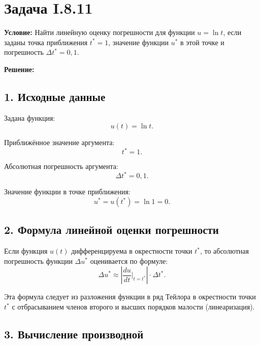 \documentclass{article}
\begin{document}
\section*{Задача I.8.11}

\textbf{Условие:} Найти линейную оценку погрешности для функции $u = \ln t$, если заданы точка приближения $t^* = 1$, значение функции $u^*$ в этой точке и погрешность $\Delta t^* = 0{,}1$.

\vspace{0.5cm}
\textbf{Решение:}

\subsection*{1. Исходные данные}

Задана функция:
\begin{equation}
u(t) = \ln t.
\end{equation}

Приближённое значение аргумента:
\begin{equation}
t^* = 1.
\end{equation}

Абсолютная погрешность аргумента:
\begin{equation}
\Delta t^* = 0{,}1.
\end{equation}

Значение функции в точке приближения:
\begin{equation}
u^* = u(t^*) = \ln 1 = 0.
\end{equation}

\subsection*{2. Формула линейной оценки погрешности}

Если функция $u(t)$ дифференцируема в окрестности точки $t^*$, то абсолютная погрешность функции $\Delta u^*$ оценивается по формуле:
\begin{equation}
\Delta u^* \approx \left| \frac{du}{dt}\bigg|_{t = t^*} \right| \cdot \Delta t^*.
\label{eq:lin_err}
\end{equation}

Эта формула следует из разложения функции в ряд Тейлора в окрестности точки $t^*$ с отбрасыванием членов второго и высших порядков малости (линеаризация).

\subsection*{3. Вычисление производной}
\end{document}
